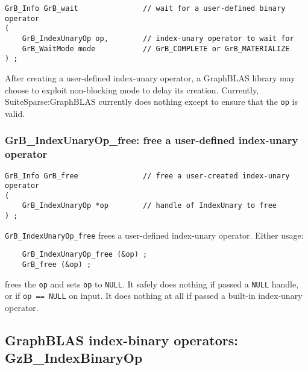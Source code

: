 \documentclass[12pt]{article}
\begin{document}
\begin{mdframed}[userdefinedwidth=6in]
{\footnotesize
\begin{verbatim}
GrB_Info GrB_wait               // wait for a user-defined binary operator
(
    GrB_IndexUnaryOp op,        // index-unary operator to wait for
    GrB_WaitMode mode           // GrB_COMPLETE or GrB_MATERIALIZE
) ;
\end{verbatim}
}\end{mdframed}

After creating a user-defined index-unary operator, a GraphBLAS library may choose
to exploit non-blocking mode to delay its creation.  Currently,
SuiteSparse:GraphBLAS currently does nothing except to ensure that the
\verb'op' is valid.

\newpage
\subsubsection{{\sf GrB\_IndexUnaryOp\_free:} free a user-defined index-unary operator}
\label{idxunop_free}

\begin{mdframed}[userdefinedwidth=6in]
{\footnotesize
\begin{verbatim}
GrB_Info GrB_free               // free a user-created index-unary operator
(
    GrB_IndexUnaryOp *op        // handle of IndexUnary to free
) ;
\end{verbatim}
}\end{mdframed}

\verb'GrB_IndexUnaryOp_free' frees a user-defined index-unary operator.  Either usage:

    {\small
    \begin{verbatim}
    GrB_IndexUnaryOp_free (&op) ;
    GrB_free (&op) ; \end{verbatim}}

\noindent
frees the \verb'op' and sets \verb'op' to \verb'NULL'.  It safely
does nothing if passed a \verb'NULL' handle, or if \verb'op == NULL' on
input.  It does nothing at all if passed a built-in index-unary operator.


\newpage
\subsection{GraphBLAS index-binary operators: {\sf GzB\_IndexBinaryOp}}
\label{idxbinaryop}
\end{document}
